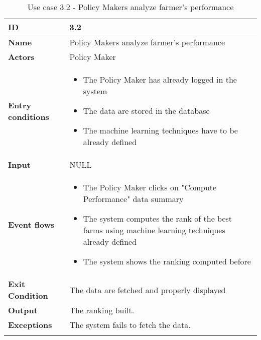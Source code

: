 \begin{longtable}[H]{ | l | p{10cm} | }
\hline
{\cellcolor[rgb]{0.753,0.753,0.753}}\textbf{ID}  & 3.2 \\ \hline
{\cellcolor[rgb]{0.753,0.753,0.753}}\textbf{Name} & Policy Makers analyze farmer’s performance  \\ \hline
{\cellcolor[rgb]{0.753,0.753,0.753}}\textbf{Actors} & Policy Maker \\ \hline
{\cellcolor[rgb]{0.753,0.753,0.753}}\textbf{Entry conditions} &
\begin{itemize}
    \item The Policy Maker has already logged in the system
    \item The data are stored in the database
    \item The machine learning techniques have to be already defined
\end{itemize}
\\ \hline
{\cellcolor[rgb]{0.753,0.753,0.753}}\textbf{Input} & NULL\\ \hline
{\cellcolor[rgb]{0.753,0.753,0.753}}\textbf{Event flows} &
\begin{itemize}
    \item The Policy Maker clicks on "Compute Performance" data summary
    \item The system computes the rank of the best farms using machine learning techniques already defined
    \item The system shows the ranking computed before 
\end{itemize}
\\ \hline
{\cellcolor[rgb]{0.753,0.753,0.753}}\textbf{Exit Condition} & The data are fetched and properly displayed\\ \hline
{\cellcolor[rgb]{0.753,0.753,0.753}}\textbf{Output} & 
The ranking built.
\\ \hline
{\cellcolor[rgb]{0.753,0.753,0.753}}\textbf{Exceptions} &
The system fails to fetch the data.
\\ \hline
\caption{Use case 3.2 - Policy Makers analyze farmer’s performance}
\\
\end{longtable}